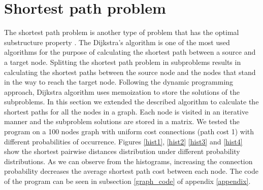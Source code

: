 \documentclass[runningheads]{llncs}
\begin{document}
\section{Shortest path problem}
The shortest path problem is another type of problem that has the
optimal substructure property \cite{dijkstra}. The Dijkstra's
algorithm is one of the most used algorithms for the purpose of
calculating the shortest path between a source and a target
node. Splitting the shortest path problem in subproblems results in
calculating the shortest paths between the source node and the nodes
that stand in the way to reach the target node. Following the dynamic
programming approach, Dijkstra algorithm uses memoization to store the
solutions of the subproblems. In this section we extended the
described algorithm to calculate the shortest paths for all the nodes
in a graph. Each node is visited in an iterative manner and the
subproblem solutions are stored in a matrix. We tested the program on
a 100 nodes graph with uniform cost connections (path cost 1) with
different probabilities of occurrence. Figures \ref{hist1},
\ref{hist2} \ref{hist3} and \ref{hist4} show the shortest pairwise
distances distribution under different probability distributions. As
we can observe from the histograms, increasing the connection
probability decreases the average shortest path cost between each node.
The code of the program can be seen in subsection \ref{graph_code} of
appendix \ref{appendix}.
\end{document}
